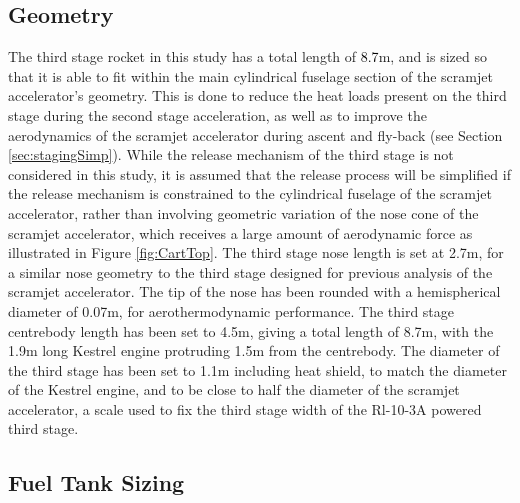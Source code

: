  \subsection{Geometry}\label{sec:3int}
The third stage rocket in this study has a total length of \textcolor{black}{8.7}m, and is sized so that it is able to fit within the main cylindrical fuselage section of the scramjet accelerator's geometry. This is done to reduce the heat loads present on the third stage during the second stage acceleration, as well as to improve the aerodynamics of the scramjet accelerator during ascent and fly-back (see Section \ref{sec:stagingSimp}). While the release mechanism of the third stage is not considered in this study, it is assumed that the release process will be simplified if the release mechanism is constrained to the cylindrical fuselage of the scramjet accelerator, rather than involving geometric variation of the nose cone of the scramjet accelerator, which receives a large amount of aerodynamic force as illustrated in Figure \ref{fig:CartTop}.
 The third stage nose length is set at 2.7m, for a similar nose geometry to the third stage designed for previous analysis of the scramjet accelerator\cite{Preller2017b}. The tip of the nose has been rounded with a hemispherical diameter of 0.07m, for aerothermodynamic performance.
 The third stage centrebody length has been set to 4.5m, giving a total length of 8.7m, with the 1.9m long Kestrel engine\cite{Vehicle2008} protruding 1.5m from the centrebody. The diameter of the third stage has been set to 1.1m including heat shield, to match the diameter of the Kestrel engine, and to be close to half the diameter of the scramjet accelerator, a scale used to fix the third stage width of the Rl-10-3A powered third stage\cite{Preller2017b}.  






	


\subsection{Fuel Tank Sizing}


